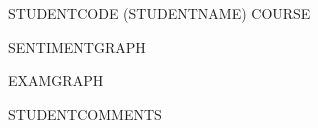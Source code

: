 STUDENTCODE (STUDENTNAME) \hfill COURSE \\

\noindent
\begin{minipage}[t]{0.49\textwidth}
\centering
SENTIMENTGRAPH
\end{minipage}
\hfill
\begin{minipage}[t]{0.49\textwidth}
\centering
EXAMGRAPH
\end{minipage}

STUDENTCOMMENTS
